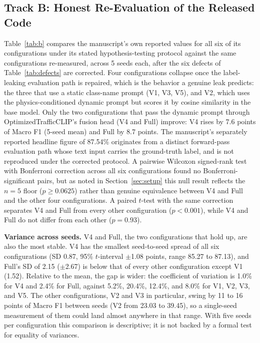 \documentclass[journal]{IEEEtran}
\begin{document}
\subsection{Track B: Honest Re-Evaluation of the Released Code}
Table~\ref{tab:b} compares the manuscript's own reported values for all six of its configurations under its stated hypothesis-testing protocol against the same configurations re-measured, across 5 seeds each, after the six defects of Table~\ref{tab:defects} are corrected. Four configurations collapse once the label-leaking evaluation path is repaired, which is the behavior a genuine leak predicts: the three that use a static class-name prompt (V1, V3, V5), and V2, which uses the physics-conditioned dynamic prompt but scores it by cosine similarity in the base model. Only the two configurations that pass the dynamic prompt through OptimizedTrafficCLIP's fusion head (V4 and Full) improve: V4 rises by 7.6 points of Macro F1 (5-seed mean) and Full by 8.7 points. The manuscript's separately reported headline figure of 87.54\% originates from a distinct forward-pass evaluation path whose text input carries the ground-truth label, and is not reproduced under the corrected protocol. A pairwise Wilcoxon signed-rank test with Bonferroni correction across all six configurations found no Bonferroni-significant pairs, but as noted in Section~\ref{sec:setup} this null result reflects the $n=5$ floor ($p \geq 0.0625$) rather than genuine equivalence between V4 and Full and the other four configurations. A paired $t$-test with the same correction separates V4 and Full from every other configuration ($p<0.001$), while V4 and Full do not differ from each other ($p=0.93$).

\textbf{Variance across seeds.} V4 and Full, the two configurations that hold up, are also the most stable. V4 has the smallest seed-to-seed spread of all six configurations (SD 0.87, 95\% $t$-interval $\pm$1.08 points, range 85.27 to 87.13), and Full's SD of 2.15 ($\pm$2.67) is below that of every other configuration except V1 (1.52). Relative to the mean, the gap is wider: the coefficient of variation is 1.0\% for V4 and 2.4\% for Full, against 5.2\%, 20.4\%, 12.4\%, and 8.0\% for V1, V2, V3, and V5. The other configurations, V2 and V3 in particular, swing by 11 to 16 points of Macro F1 between seeds (V2 from 23.03 to 39.45), so a single-seed measurement of them could land almost anywhere in that range. With five seeds per configuration this comparison is descriptive; it is not backed by a formal test for equality of variances.
\end{document}
